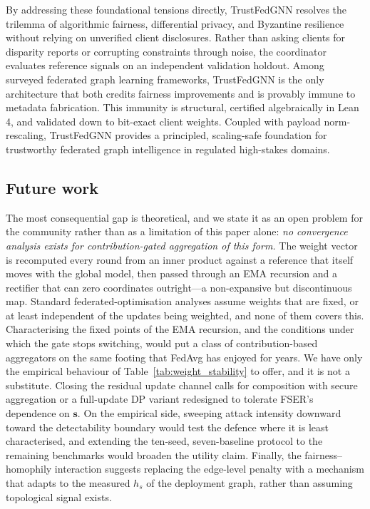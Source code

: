 \documentclass[preprint,12pt]{elsarticle}
\theoremstyle{plain}
\theoremstyle{definition}
\theoremstyle{remark}
\begin{document}
By addressing these foundational tensions directly, TrustFedGNN resolves the trilemma of algorithmic fairness, differential privacy, and Byzantine resilience without relying on unverified client disclosures. Rather than asking clients for disparity reports or corrupting constraints through noise, the coordinator evaluates reference signals on an independent validation holdout. Among surveyed federated graph learning frameworks, TrustFedGNN is the only architecture that both credits fairness improvements and is provably immune to metadata fabrication. This immunity is structural, certified algebraically in Lean 4, and validated down to bit-exact client weights. Coupled with payload norm-rescaling, TrustFedGNN provides a principled, scaling-safe foundation for trustworthy federated graph intelligence in regulated high-stakes domains.

\subsection*{Future work}
The most consequential gap is theoretical, and we state it as an open problem for the community rather than as a limitation of this paper alone: \emph{no convergence analysis exists for contribution-gated aggregation of this form.} The weight vector is recomputed every round from an inner product against a reference that itself moves with the global model, then passed through an EMA recursion and a rectifier that can zero coordinates outright---a non-expansive but discontinuous map. Standard federated-optimisation analyses assume weights that are fixed, or at least independent of the updates being weighted, and none of them covers this. Characterising the fixed points of the EMA recursion, and the conditions under which the gate stops switching, would put a class of contribution-based aggregators on the same footing that FedAvg has enjoyed for years. We have only the empirical behaviour of Table~\ref{tab:weight_stability} to offer, and it is not a substitute. Closing the residual update channel calls for composition with secure aggregation or a full-update DP variant redesigned to tolerate FSER's dependence on $\bm{s}$. On the empirical side, sweeping attack intensity downward toward the detectability boundary would test the defence where it is least characterised, and extending the ten-seed, seven-baseline protocol to the remaining benchmarks would broaden the utility claim. Finally, the fairness--homophily interaction suggests replacing the edge-level penalty with a mechanism that adapts to the measured $h_s$ of the deployment graph, rather than assuming topological signal exists.
\end{document}
